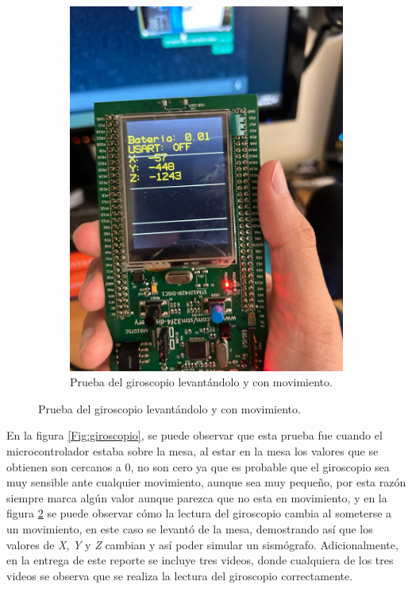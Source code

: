 \begin{figure}[H]
\begin{subfigure}{0.5\textwidth}
        \includegraphics[width=\textwidth]{Imagenes/giroscopio.jpg} 
        \caption{Prueba del giroscopio levantándolo y con movimiento.}
        \label{Fig:giroscopio2}
    \end{subfigure}
    \end{figure}

En la figura \ref{Fig:giroscopio}, se puede observar que esta prueba fue cuando el microcontrolador estaba sobre la mesa, al estar en la mesa los valores que se obtienen son cercanos a 0, no son cero ya que es probable que el giroscopio sea muy sensible ante cualquier movimiento, aunque sea muy pequeño, por esta razón siempre marca algún valor aunque parezca que no esta en movimiento, y en la figura \ref{Fig:giroscopio2} se puede observar cómo la lectura del giroscopio cambia al someterse a un movimiento, en este caso se levantó de la mesa, demostrando así que los valores de \textit{X}, \textit{Y} y \textit{Z} cambian y así poder simular un sismógrafo.
Adicionalmente, en la entrega de este reporte se incluye tres videos, donde cualquiera de los tres videos se observa que se realiza la lectura del giroscopio correctamente.

